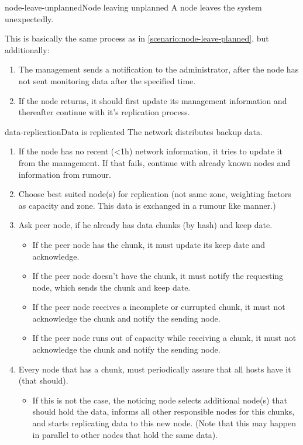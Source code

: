 \begin{scenario}{node-leave-unplanned}{Node leaving unplanned}
    A node leaves the system unexpectedly.

	This is basically the same process as in \ref{scenario:node-leave-planned}, but additionally:
	\begin{enumerate}
		\item The management sends a notification to the administrator, after the node has not sent monitoring data after the specified time.
		\item If the node returns, it should first update its management information and thereafter continue with it's replication process.
	\end{enumerate}
\end{scenario}

\begin{scenario}{data-replication}{Data is replicated}
	The network distributes backup data.
   	\begin{enumerate}
   		\item If the node has no recent (<1h) network information, it tries to update it from the management. If that fails, continue with already known nodes and information from rumour.
   		\item Choose best suited node(s) for replication (not same zone, weighting factors as capacity and zone. This data is exchanged in a rumour like manner.)
   		\item Ask peer node, if he already has data chunks (by hash) and keep date.
   			\begin{itemize} %
   				\item If the peer node has the chunk, it must update its keep date and acknowledge.
   				\item If the peer node doesn't have the chunk, it must notify the requesting node, which sends the chunk and keep date.
   				\item If the peer node receives a incomplete or currupted chunk, it must not acknowledge the chunk and notify the sending node.
   				\item If the peer node runs out of capacity while receiving a chunk, it must not acknowledge the chunk and notify the sending node.
   			\end{itemize}
   		\item Every node that has a chunk, must periodically assure that all hosts have it (that should).
   			\begin{itemize}
	   			\item If this is not the case, the noticing node selects additional node(s) that should hold the data, informs all other responsible nodes for this chunks, and starts replicating data to this new node. (Note that this may happen in parallel to other nodes that hold the same data).
	   		\end{itemize}
   	\end{enumerate}
        

\end{scenario}
